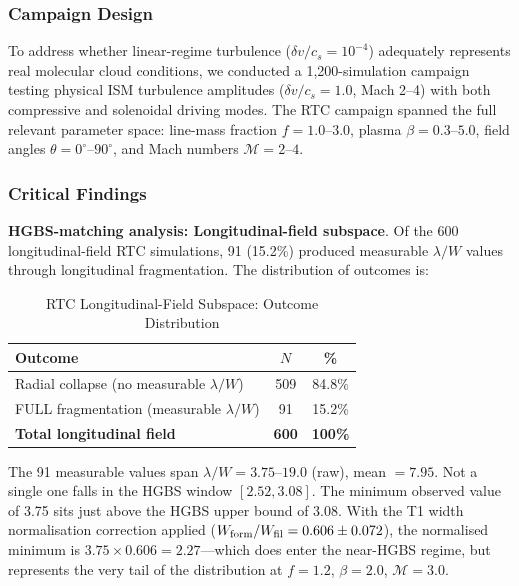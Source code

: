 \documentclass[twocolumn,usenatbib]{mnras}
\begin{document}
\subsubsection{Campaign Design}

To address whether linear-regime turbulence ($\delta v/c_s = 10^{-4}$) adequately represents real molecular cloud conditions, we conducted a 1,200-simulation campaign testing physical ISM turbulence amplitudes ($\delta v/c_s = 1.0$, Mach 2--4) with both compressive and solenoidal driving modes. The RTC campaign spanned the full relevant parameter space: line-mass fraction $f = 1.0$--$3.0$, plasma $\beta = 0.3$--$5.0$, field angles $\theta = 0^{\circ}$--$90^{\circ}$, and Mach numbers $\mathcal{M} = 2$--$4$.

\subsubsection{Critical Findings}

\textbf{HGBS-matching analysis: Longitudinal-field subspace}. Of the 600 longitudinal-field RTC simulations, 91 (15.2\%) produced measurable $\lambda/W$ values through longitudinal fragmentation. The distribution of outcomes is:

\begin{table}[h]
\caption{RTC Longitudinal-Field Subspace: Outcome Distribution}
\label{tab:rtc_outcomes}
\begin{tabular}{lcc}
\toprule
Outcome & $N$ & \% \\
\midrule
Radial collapse (no measurable $\lambda/W$) & 509 & 84.8\% \\
FULL fragmentation (measurable $\lambda/W$) & 91 & 15.2\% \\
\midrule
\textbf{Total longitudinal field} & \textbf{600} & \textbf{100\%} \\
\bottomrule
\end{tabular}
\end{table}

The 91 measurable values span $\lambda/W = 3.75$--$19.0$ (raw), mean $= 7.95$. Not a single one falls in the HGBS window $[2.52, 3.08]$. The minimum observed value of 3.75 sits just above the HGBS upper bound of 3.08. With the T1 width normalisation correction applied ($W_{\rm form}/W_{\rm fil} = 0.606 \pm 0.072$), the normalised minimum is $3.75 \times 0.606 = 2.27$—which does enter the near-HGBS regime, but represents the very tail of the distribution at $f=1.2$, $\beta=2.0$, $\mathcal{M}=3.0$.
\end{document}
